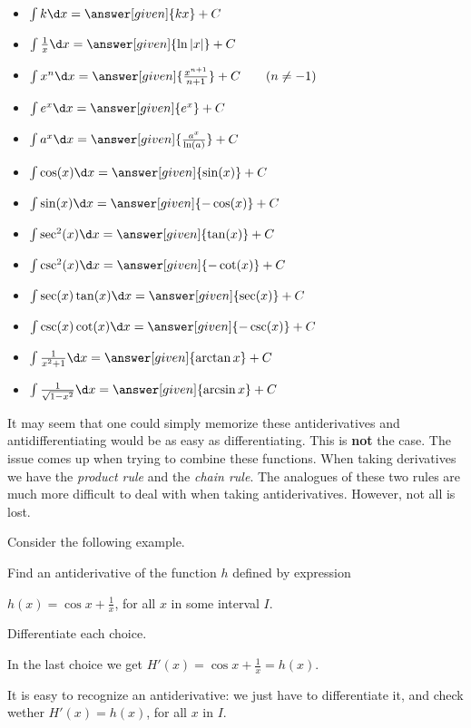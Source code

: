 \documentclass{ximera}
\begin{document}
\begin{theorem}\hfil
\begin{itemize}
\item $\int k \d x= \answer[given]{k x}+C$
\item $\int \frac{1}{x} \d x= \answer[given]{\ln|x|}+C$
\item $\int x^n \d x= \answer[given]{\frac{x^{n+1}}{n+1}}+C\qquad(n\ne-1)$
\item $\int e^x \d x= \answer[given]{e^x} + C$
\item $\int a^x \d x= \answer[given]{\frac{a^x}{\ln(a)}}+C$
\item $\int \cos(x) \d x = \answer[given]{\sin(x)} + C$
\item $\int \sin(x) \d x = \answer[given]{-\cos(x)} + C$  
\item $\int \sec^2(x) \d x = \answer[given]{\tan(x)} + C$
\item $\int \csc^2(x) \d x = \answer[given]{-\cot(x)} + C$
\item $\int \sec(x)\tan(x) \d x = \answer[given]{\sec(x)} + C$
\item $\int \csc(x)\cot(x) \d x = \answer[given]{-\csc(x)} + C$
\item $\int \frac{1}{x^2+1}\d x = \answer[given]{\arctan{x}} + C$
\item $\int \frac{1}{\sqrt{1-x^2}}\d x= \answer[given]{\arcsin{x}}+C$
\end{itemize}
\end{theorem}


It may seem that one could simply memorize these antiderivatives and
antidifferentiating would be as easy as differentiating. This is
\textbf{not} the case. The issue comes up when trying to combine these
functions.  When taking derivatives we have the \textit{product rule}
and the \textit{chain rule}. The analogues of these two rules are much
more difficult to deal with when taking antiderivatives. However, not
all is lost.

Consider the following example.
\begin{example}
  Find  an antiderivative of the function $h$ defined by expression
  
   $h(x)=\cos{x}+\frac{1}{x}$, for all $x$ in some interval $I$.
  \begin{multipleChoice}
  \end{multipleChoice}
  \begin{feedback}
    Differentiate each choice.
    
     In the last choice we get $H'(x)=\cos{x}+\frac{1}{x}=h(x)$.
  \end{feedback}
\end{example}
It is easy to recognize an antiderivative: we just have to differentiate it, and check wether $H'(x)=h(x)$, for all $x$ in $I$.
\end{document}
